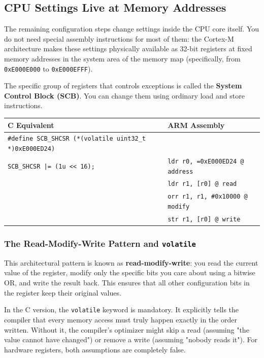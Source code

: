 \subsection{CPU Settings Live at Memory Addresses}
The remaining configuration steps change settings inside the CPU core itself. You do not need special assembly instructions for most of them: the Cortex-M architecture makes these settings physically available as 32-bit registers at fixed memory addresses in the system area of the memory map (specifically, from \texttt{0xE000E000} to \texttt{0xE000EFFF}). 

The specific group of registers that controls exceptions is called the \textbf{System Control Block (SCB)}. You can change them using ordinary load and store instructions.

\begin{table}[h!]
    \centering
    \begin{tabular}{|l|l|}
        \hline
        \textbf{C Equivalent} & \textbf{ARM Assembly} \\ \hline
        \texttt{\#define SCB\_SHCSR (*(volatile uint32\_t *)0xE000ED24)} & \\ 
        \texttt{SCB\_SHCSR |= (1u << 16);} & \texttt{ldr r0, =0xE000ED24   @ address} \\
        & \texttt{ldr r1, [r0]          @ read} \\
        & \texttt{orr r1, r1, \#0x10000 @ modify} \\
        & \texttt{str r1, [r0]          @ write} \\ \hline
    \end{tabular}
\end{table}

\subsubsection{The Read-Modify-Write Pattern and \texttt{volatile}}
This architectural pattern is known as \textbf{read-modify-write}: you read the current value of the register, modify only the specific bits you care about using a bitwise OR, and write the result back. This ensures that all other configuration bits in the register keep their original values.

In the C version, the \texttt{volatile} keyword is mandatory. It explicitly tells the compiler that every memory access must truly happen exactly in the order written. Without it, the compiler's optimizer might skip a read (assuming "the value cannot have changed") or remove a write (assuming "nobody reads it"). For hardware registers, both assumptions are completely false.

